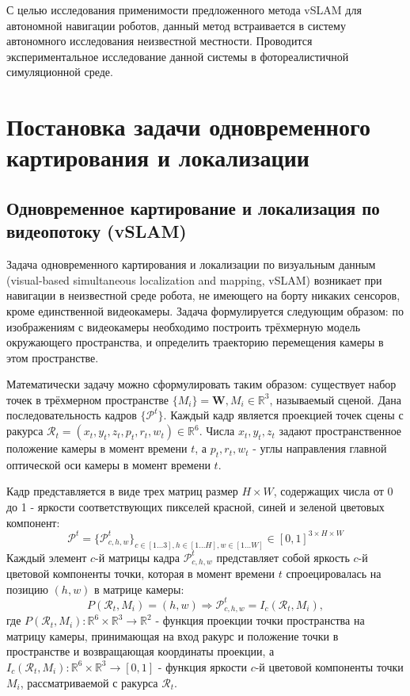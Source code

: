 \documentclass{mipt-thesis-ms}
\begin{document}
	С целью исследования применимости предложенного метода vSLAM для автономной навигации роботов, данный метод встраивается в систему автономного исследования неизвестной местности. Проводится экспериментальное исследование данной системы в фотореалистичной симуляционной среде.
	
	
	\chapter{Постановка задачи одновременного картирования и локализации}
	
	\section{Одновременное картирование и локализация по видеопотоку (vSLAM)}
	
	Задача одновременного картирования и локализации по визуальным данным (visual-based simultaneous localization and mapping, vSLAM) возникает при навигации в неизвестной среде робота, не имеющего на борту никаких сенсоров, кроме единственной видеокамеры. Задача формулируется следующим образом: по изображениям с видеокамеры необходимо построить трёхмерную модель окружающего пространства, и определить траекторию перемещения камеры в этом пространстве.
	
	Математически задачу можно сформулировать таким образом: существует набор точек в трёхмерном пространстве $\{M_i \} = \textbf{W}, M_i \in \mathbb{R}^3$, называемый сценой. Дана последовательность кадров $\{\mathcal{P}^t\}$. Каждый кадр является проекцией точек сцены с ракурса $\mathcal{R}_t = (x_t, y_t, z_t, p_t, r_t, w_t) \in \mathbb{R}^6$. Числа $x_t, y_t, z_t$ задают пространственное положение камеры в момент времени $t$, а $p_t, r_t, w_t$ - углы направления главной оптической оси камеры в момент времени $t$.
	
	Кадр представляется в виде трех матриц размер $H \times W$, содержащих числа от 0 до 1 - яркости соответствующих пикселей красной, синей и зеленой цветовых компонент:
	$$\mathcal{P}^t = \{\mathcal{P}^t_{c,h,w}\}_{c \in [1 \dots 3], h \in [1 \dots H], w \in [1 \dots W]} \in [0, 1]^{3 \times H \times W}$$
	Каждый элемент $c$-й матрицы кадра $\mathcal{P}^t_{c,h,w}$ представляет собой яркость $c$-й цветовой компоненты точки, которая в момент времени $t$ спроецировалась на позицию $(h, w)$ в матрице камеры:
	$$P(\mathcal{R}_t, M_i) = (h, w) \Rightarrow \mathcal{P}^t_{c,h,w} = I_c(\mathcal{R}_t, M_i),$$
	где $P(\mathcal{R}_t, M_i): \mathbb{R}^6 \times \mathbb{R}^3 \rightarrow \mathbb{R}^2$ - функция проекции точки пространства на матрицу камеры, принимающая на вход ракурс и положение точки в пространстве и возвращающая координаты проекции, а $I_c (\mathcal{R}_t, M_i): \mathbb{R}^6 \times \mathbb{R}^3 \rightarrow [0, 1]$ - функция яркости $c$-й цветовой компоненты точки $M_i$, рассматриваемой с ракурса $\mathcal{R}_t$.
	
\end{document}
